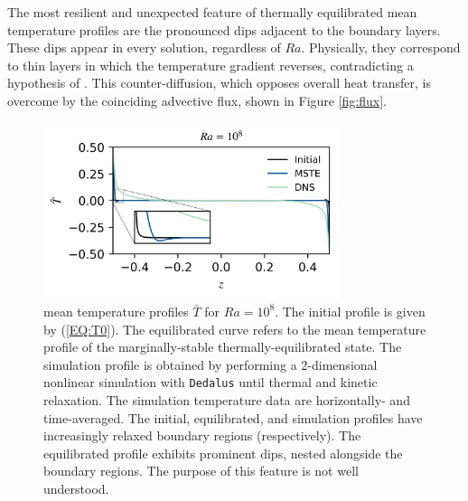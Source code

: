 \documentclass[reprint,amsmath,amssymb,aps]{revtex4-1}
\begin{document}
The most resilient and unexpected feature of thermally equilibrated mean temperature profiles are the pronounced dips adjacent to the boundary layers. 
These dips appear in every solution, regardless of $Ra$. 
Physically, they correspond to thin layers in which the temperature gradient reverses, contradicting a hypothesis of \cite{Malkus_1954}. 
This counter-diffusion, which opposes overall heat transfer, is overcome by the coinciding advective flux, shown in Figure \ref{fig:flux}.  
\begin{figure}
    \centering
    \includegraphics[width=3.4in]{T_profs_na.png}
    \caption{mean temperature profiles $\bar{T}$ for $Ra = 10^8$. 
    The initial profile is given by (\ref{EQ:T0}). 
    The equilibrated curve refers to the mean temperature profile of the marginally-stable thermally-equilibrated state. 
    The simulation profile is obtained by performing a 2-dimensional nonlinear simulation with \texttt{Dedalus} until thermal and kinetic relaxation. 
    The simulation temperature data are horizontally- and time-averaged. 
    The initial, equilibrated, and simulation profiles have increasingly relaxed boundary regions (respectively). 
    The equilibrated profile exhibits prominent dips, nested alongside the boundary regions. 
    The purpose of this feature is not well understood.}
    \label{fig:T0_profiles}
\end{figure}
\end{document}
